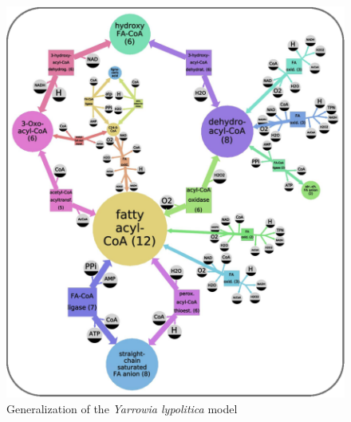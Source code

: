 \documentclass[9pt]{article}
\newcounter{fig}
\newcounter{rm}
\begin{document}
\begin{figure}[th]
\captionsetup{labelformat=empty}
\centering
\includegraphics{../pics/Zhukova_Fig_2.eps}
\caption{Generalization of the \textit{Yarrowia lypolitica} model}  
\end{figure}
\clearpage
\end{document}
